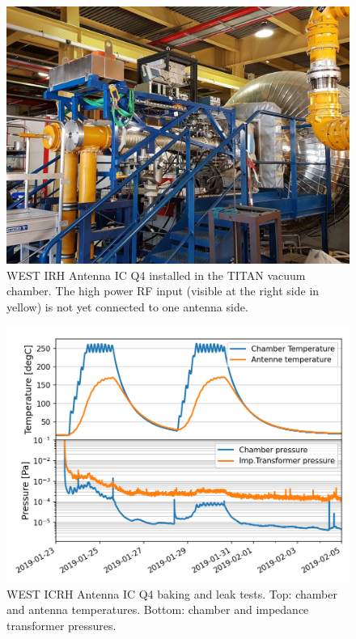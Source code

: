 \documentclass[12p]{iopart}
\begin{document}
\begin{figure}
	\centering
	\includegraphics[width=0.95\linewidth]{figures/titan}
	\caption{WEST IRH Antenna IC Q4 installed in the TITAN vacuum chamber. The high power RF input (visible at the right side in yellow) is not yet connected to one antenna side.}
	\label{fig:titan}
\end{figure}


\begin{figure}
	\centering
	\includegraphics[width=0.95\linewidth]{figures/baking}
	\caption{WEST ICRH Antenna IC Q4 baking and leak tests. Top: chamber and antenna temperatures. Bottom: chamber and impedance transformer pressures.}
	\label{fig:baking}
\end{figure}
\end{document}

